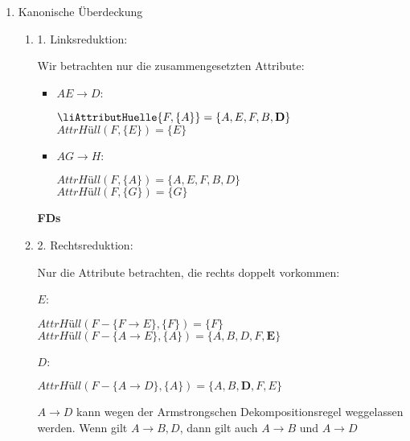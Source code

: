 \documentclass{lehramt-informatik-aufgabe}
\begin{document}
\begin{liAntwort}

\begin{enumerate}

\item Kanonische Überdeckung

\begin{enumerate}

%

\item 1. Linksreduktion:

Wir betrachten nur die zusammengesetzten Attribute:

\begin{itemize}
\item $AE \rightarrow D$:

$\liAttributHuelle{F, \{A\}} = \{A, E, F, B, \textbf{D}\}$ \\
$\textit{AttrHüll}(F, \{E\}) = \{E\}$

\item $AG \rightarrow H$:

$\textit{AttrHüll}(F, \{A\}) = \{A, E, F, B, D\}$ \\
$\textit{AttrHüll}(F, \{G\}) = \{G\}$
\end{itemize}

\textbf{FDs}


%

\item 2. Rechtsreduktion:

Nur die Attribute betrachten, die rechts doppelt vorkommen:

$E$:

$\textit{AttrHüll}(F - \{F \rightarrow E\}, \{F\}) = \{F\}$ \\
$\textit{AttrHüll}(F - \{A \rightarrow E\}, \{A\}) = \{A, B, D, F, \textbf{E}\}$

$D$:

$\textit{AttrHüll}(F - \{A \rightarrow D\}, \{A\}) = \{A, B, \textbf{D}, F, E\}$

$A \rightarrow D$ kann wegen der Armstrongschen Dekompositionsregel
weggelassen werden. Wenn gilt $A \rightarrow B, D$, dann gilt auch $A
\rightarrow B$ und $A \rightarrow D$


\end{enumerate}
\end{enumerate}
\end{liAntwort}
\end{document}
